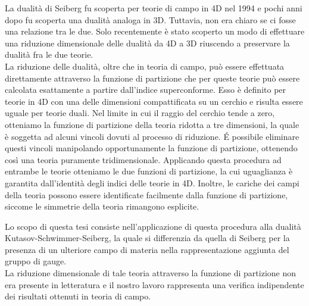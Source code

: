 \documentclass[a4paper,12pt]{article}
\begin{document}
La dualità di Seiberg fu scoperta per teorie di campo in 4D nel 1994 e pochi anni dopo fu scoperta una dualità analoga in 3D.
Tuttavia, non era chiaro se ci fosse una relazione tra le due.
Solo recentemente è stato scoperto un modo di effettuare una riduzione dimensionale delle dualità da 4D a 3D riuscendo a preservare la dualità fra le due teorie. \\
La riduzione delle dualità, oltre che in teoria di campo, può essere effettuata direttamente attraverso la funzione di partizione che per queste teorie può essere calcolata esattamente a partire dall'indice superconforme.
Esso è definito per teorie in 4D con una delle dimensioni compattificata su un cerchio e risulta essere uguale per teorie duali.
Nel limite in cui il raggio del cerchio tende a zero, otteniamo la funzione di partizione della teoria ridotta a tre dimensioni, la quale è soggetta ad alcuni vincoli dovuti al processo di riduzione.
\'E possibile eliminare questi vincoli manipolando opportunamente la funzione di partizione, ottenendo così una teoria puramente tridimensionale. 
Applicando questa procedura ad entrambe le teorie otteniamo le due funzioni di partizione, la cui uguaglianza è garantita dall'identità degli indici delle teorie in 4D.
Inoltre, le cariche dei campi della teoria possono essere identificate facilmente dalla funzione di partizione, siccome le simmetrie della teoria rimangono esplicite.

Lo scopo di questa tesi consiste nell'applicazione di questa procedura alla dualità Kutasov-Schwimmer-Seiberg, la quale si differenzia da quella di Seiberg per la presenza di un ulteriore campo di materia nella rappresentazione aggiunta del gruppo di gauge. \\
La riduzione dimensionale di tale teoria attraverso la funzione di partizione non era presente in letteratura e il nostro lavoro rappresenta una verifica indipendente dei risultati ottenuti in teoria di campo. 
\end{document}
